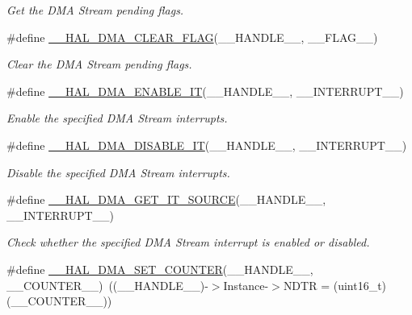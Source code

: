 \begin{DoxyCompactItemize}
\begin{DoxyCompactList}\small\item\em Get the D\+MA Stream pending flags. \end{DoxyCompactList}\item 
\#define \hyperlink{group___d_m_a_gabc041fb1c85ea7a3af94e42470ef7f2a}{\+\_\+\+\_\+\+H\+A\+L\+\_\+\+D\+M\+A\+\_\+\+C\+L\+E\+A\+R\+\_\+\+F\+L\+AG}(\+\_\+\+\_\+\+H\+A\+N\+D\+L\+E\+\_\+\+\_\+,  \+\_\+\+\_\+\+F\+L\+A\+G\+\_\+\+\_\+)
\begin{DoxyCompactList}\small\item\em Clear the D\+MA Stream pending flags. \end{DoxyCompactList}\item 
\#define \hyperlink{group___d_m_a_ga2124233229c04ca90b790cd8cddfa98b}{\+\_\+\+\_\+\+H\+A\+L\+\_\+\+D\+M\+A\+\_\+\+E\+N\+A\+B\+L\+E\+\_\+\+IT}(\+\_\+\+\_\+\+H\+A\+N\+D\+L\+E\+\_\+\+\_\+,  \+\_\+\+\_\+\+I\+N\+T\+E\+R\+R\+U\+P\+T\+\_\+\+\_\+)
\begin{DoxyCompactList}\small\item\em Enable the specified D\+MA Stream interrupts. \end{DoxyCompactList}\item 
\#define \hyperlink{group___d_m_a_ga2867eab09398df2daac55c3f327654da}{\+\_\+\+\_\+\+H\+A\+L\+\_\+\+D\+M\+A\+\_\+\+D\+I\+S\+A\+B\+L\+E\+\_\+\+IT}(\+\_\+\+\_\+\+H\+A\+N\+D\+L\+E\+\_\+\+\_\+,  \+\_\+\+\_\+\+I\+N\+T\+E\+R\+R\+U\+P\+T\+\_\+\+\_\+)
\begin{DoxyCompactList}\small\item\em Disable the specified D\+MA Stream interrupts. \end{DoxyCompactList}\item 
\#define \hyperlink{group___d_m_a_ga206f24e6bee4600515b9b6b1ec79365b}{\+\_\+\+\_\+\+H\+A\+L\+\_\+\+D\+M\+A\+\_\+\+G\+E\+T\+\_\+\+I\+T\+\_\+\+S\+O\+U\+R\+CE}(\+\_\+\+\_\+\+H\+A\+N\+D\+L\+E\+\_\+\+\_\+,  \+\_\+\+\_\+\+I\+N\+T\+E\+R\+R\+U\+P\+T\+\_\+\+\_\+)
\begin{DoxyCompactList}\small\item\em Check whether the specified D\+MA Stream interrupt is enabled or disabled. \end{DoxyCompactList}\item 
\#define \hyperlink{group___d_m_a_ga448a8f809df86ccffae200ffd33d0a82}{\+\_\+\+\_\+\+H\+A\+L\+\_\+\+D\+M\+A\+\_\+\+S\+E\+T\+\_\+\+C\+O\+U\+N\+T\+ER}(\+\_\+\+\_\+\+H\+A\+N\+D\+L\+E\+\_\+\+\_\+,  \+\_\+\+\_\+\+C\+O\+U\+N\+T\+E\+R\+\_\+\+\_\+)~((\+\_\+\+\_\+\+H\+A\+N\+D\+L\+E\+\_\+\+\_\+)-\/$>$Instance-\/$>$N\+D\+TR = (uint16\+\_\+t)(\+\_\+\+\_\+\+C\+O\+U\+N\+T\+E\+R\+\_\+\+\_\+))

\end{DoxyCompactItemize}

